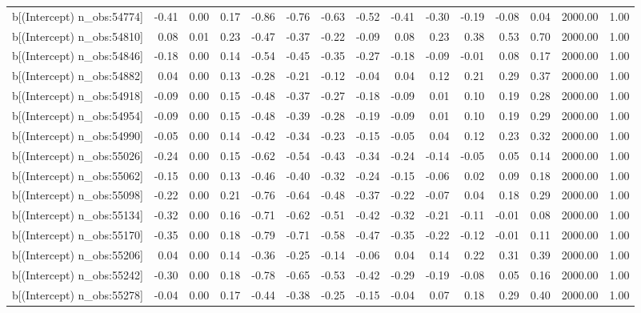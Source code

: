 \begin{table}[ht]
\begin{tabular}{rrrrrrrrrrrrrrr}
  b[(Intercept) n\_obs:54774] & -0.41 & 0.00 & 0.17 & -0.86 & -0.76 & -0.63 & -0.52 & -0.41 & -0.30 & -0.19 & -0.08 & 0.04 & 2000.00 & 1.00 \\ 
  b[(Intercept) n\_obs:54810] & 0.08 & 0.01 & 0.23 & -0.47 & -0.37 & -0.22 & -0.09 & 0.08 & 0.23 & 0.38 & 0.53 & 0.70 & 2000.00 & 1.00 \\ 
  b[(Intercept) n\_obs:54846] & -0.18 & 0.00 & 0.14 & -0.54 & -0.45 & -0.35 & -0.27 & -0.18 & -0.09 & -0.01 & 0.08 & 0.17 & 2000.00 & 1.00 \\ 
  b[(Intercept) n\_obs:54882] & 0.04 & 0.00 & 0.13 & -0.28 & -0.21 & -0.12 & -0.04 & 0.04 & 0.12 & 0.21 & 0.29 & 0.37 & 2000.00 & 1.00 \\ 
  b[(Intercept) n\_obs:54918] & -0.09 & 0.00 & 0.15 & -0.48 & -0.37 & -0.27 & -0.18 & -0.09 & 0.01 & 0.10 & 0.19 & 0.28 & 2000.00 & 1.00 \\ 
  b[(Intercept) n\_obs:54954] & -0.09 & 0.00 & 0.15 & -0.48 & -0.39 & -0.28 & -0.19 & -0.09 & 0.01 & 0.10 & 0.19 & 0.29 & 2000.00 & 1.00 \\ 
  b[(Intercept) n\_obs:54990] & -0.05 & 0.00 & 0.14 & -0.42 & -0.34 & -0.23 & -0.15 & -0.05 & 0.04 & 0.12 & 0.23 & 0.32 & 2000.00 & 1.00 \\ 
  b[(Intercept) n\_obs:55026] & -0.24 & 0.00 & 0.15 & -0.62 & -0.54 & -0.43 & -0.34 & -0.24 & -0.14 & -0.05 & 0.05 & 0.14 & 2000.00 & 1.00 \\ 
  b[(Intercept) n\_obs:55062] & -0.15 & 0.00 & 0.13 & -0.46 & -0.40 & -0.32 & -0.24 & -0.15 & -0.06 & 0.02 & 0.09 & 0.18 & 2000.00 & 1.00 \\ 
  b[(Intercept) n\_obs:55098] & -0.22 & 0.00 & 0.21 & -0.76 & -0.64 & -0.48 & -0.37 & -0.22 & -0.07 & 0.04 & 0.18 & 0.29 & 2000.00 & 1.00 \\ 
  b[(Intercept) n\_obs:55134] & -0.32 & 0.00 & 0.16 & -0.71 & -0.62 & -0.51 & -0.42 & -0.32 & -0.21 & -0.11 & -0.01 & 0.08 & 2000.00 & 1.00 \\ 
  b[(Intercept) n\_obs:55170] & -0.35 & 0.00 & 0.18 & -0.79 & -0.71 & -0.58 & -0.47 & -0.35 & -0.22 & -0.12 & -0.01 & 0.11 & 2000.00 & 1.00 \\ 
  b[(Intercept) n\_obs:55206] & 0.04 & 0.00 & 0.14 & -0.36 & -0.25 & -0.14 & -0.06 & 0.04 & 0.14 & 0.22 & 0.31 & 0.39 & 2000.00 & 1.00 \\ 
  b[(Intercept) n\_obs:55242] & -0.30 & 0.00 & 0.18 & -0.78 & -0.65 & -0.53 & -0.42 & -0.29 & -0.19 & -0.08 & 0.05 & 0.16 & 2000.00 & 1.00 \\ 
  b[(Intercept) n\_obs:55278] & -0.04 & 0.00 & 0.17 & -0.44 & -0.38 & -0.25 & -0.15 & -0.04 & 0.07 & 0.18 & 0.29 & 0.40 & 2000.00 & 1.00 \\ 

\end{tabular}
\end{table}
